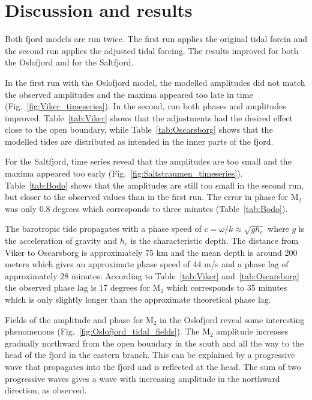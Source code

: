 \section{Discussion and results}

Both fjord models are run twice. The first run applies the original tidal forcin and the second run applies the adjusted tidal forcing. The results improved for both the Oslofjord and for the Saltfjord. 

In the first run with the Oslofjord model, the modelled amplitudes did not match the observed amplitudes and the maxima appeared too late in time (Fig.~\ref{fig:Viker_timeseries}). In the second, run both phases and amplitudes improved. Table~\ref{tab:Viker} shows that the adjustments had the desired effect close to the open boundary, while Table~\ref{tab:Oscarsborg} shows that the modelled tides are distributed as intended in the inner parts of the fjord. 

For the Saltfjord, time series reveal that the amplitudes are too small and the maxima appeared too early (Fig.~\ref{fig:Saltstraumen_timeseries}). Table~\ref{tab:Bodo} shows that the amplitudes are still too small in the second run, but closer to the observed values than in the first run. The error in phase for M$_2$ was only $0.8$ degrees which corresponds to three minutes (Table~\ref{tab:Bodo}).

The barotropic tide propagates with a phase speed of $c = \omega/k \approx \sqrt{g h_c}$ where $g$ is the acceleration of gravity and $h_c$ is the characteristic depth. The distance from Viker to Oscarsborg is approximately 75 km and the mean depth is around 200 meters which gives an approximate phase speed of 44 m/s and a phase lag of approximately 28 minutes. According to Table~\ref{tab:Viker} and~\ref{tab:Oscarsborg} the observed phase lag is 17 degrees for M$_2$ which corresponds to 35 minutes which is only slightly longer than the approximate theoretical phase lag. 

Fields of the amplitude and phase for M$_2$ in the Oslofjord reveal some interesting phenomenons (Fig.~\ref{fig:Oslofjord_tidal_fields}). 
The M$_2$ amplitude increases gradually northward from the open boundary in the south and all the way to the head of the fjord in the eastern branch. 
This can be explained by a progressive wave that propagates into the fjord and is reflected at the head.
The sum of two progressive waves gives a wave with increasing amplitude in the northward direction, as observed. 

